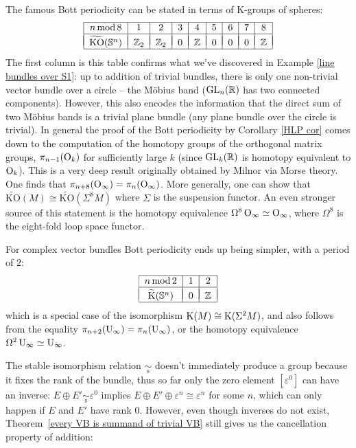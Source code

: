 \begin{example}
The famous Bott periodicity can be stated in terms of K-groups of spheres:
\[\begin{tabular}{|c|c|c|c|c|c|c|c|c|}
\hline 
$n\,\mathrm{mod}\,8$ & 1 & 2 & 3 & 4 & 5 & 6 & 7 & 8\tabularnewline
\hline &&&&&&&&\\[-1em]
$\widetilde{\mathrm{KO}}(\bbS^{n})$ & $\bbZ_{2}$ & $\bbZ_{2}$ & $0$ & $\bbZ$ & $0$ & $0$ & $0$ & $\bbZ$\tabularnewline
\hline 
\end{tabular}\]
The first column is this table confirms what we've discovered in Example \ref{line bundles over S1}: up to addition of trivial bundles, there is only one non-trivial vector bundle over a circle -- the M\"obius band ($\operatorname{GL}_n(\mathbb{R})$ has two connected components). However, this also encodes the information that the direct sum of two M\"obius bands is a trivial plane bundle (any plane bundle over the circle is trivial). In general the proof of the Bott periodicity by Corollary \ref{HLP cor} comes down to the computation of the homotopy groups of the orthogonal matrix groups, $\pi_{n-1}(\operatorname{O}_k)$ for sufficiently large $k$ (since $\operatorname{GL}_k(\mathbb{R})$ is homotopy equivalent to $\operatorname{O}_k$). This is a very deep result originally obtained by Milnor via Morse theory. One finds that $\pi_{n+8}(\operatorname{O}_\infty)=\pi_n(\operatorname{O}_\infty)$. More generally, one can show that $\widetilde{\mathrm{KO}}(M)\cong \widetilde{\mathrm{KO}}(\Sigma^8 M)$ where $\Sigma$ is the suspension functor. An even stronger source of this statement is the homotopy equivalence $\Omega^8\operatorname{O}_\infty\simeq \operatorname{O}_\infty$, where $\Omega^8$ is the eight-fold loop space functor.

For complex vector bundles Bott periodicity ends up being simpler, with a period of $2$:
\[\begin{tabular}{|c|c|c|}
\hline 
$n\,\mathrm{mod}\,2$ & 1 & 2 \tabularnewline
\hline &&\\[-1em]
$\widetilde{\rmK}(\bbS^{n})$ & $0$ & $\bbZ$ \tabularnewline
\hline 
\end{tabular}\]
which is a special case of the isomorphism $\mathrm{K}(M)\cong \mathrm{K}(\Sigma^2 M)$, and also follows from the equality $\pi_{n+2}(\operatorname{U}_\infty)=\pi_n(\operatorname{U}_\infty)$, or the homotopy equivalence $\Omega^2 \operatorname{U}_\infty\simeq \operatorname{U}_\infty$.
\end{example}


The stable isomorphism relation $\underset{\mathrm{s}}{\sim}$ doesn't immediately produce a group because it fixes the rank of the bundle, thus so far only the zero element $[\varepsilon^0]$ can have an inverse: $E\oplus E'\underset{\mathrm{s}}{\sim}\varepsilon^0$ implies $E\oplus E'\oplus \varepsilon^n\cong \varepsilon^n$ for some $n$, which can only happen if $E$ and $E'$ have rank $0$. However, even though inverses do not exist, Theorem~\ref{every VB is summand of trivial VB} still gives us the cancellation property of addition:


